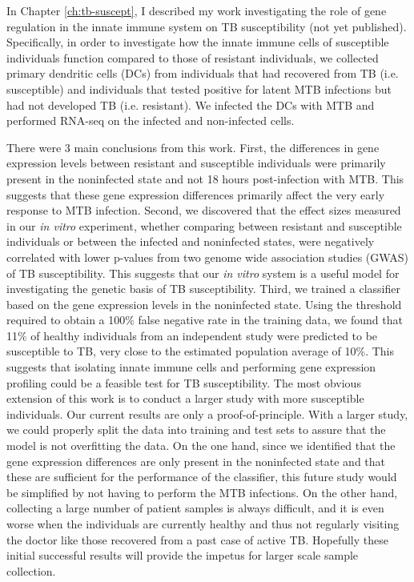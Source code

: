 In Chapter \ref{ch:tb-suscept}, I described my work investigating the
role of gene regulation in the innate immune system on TB
susceptibility (not yet published). Specifically, in order to
investigate how the innate immune cells of susceptible individuals
function compared to those of resistant individuals, we collected
primary dendritic cells (DCs) from individuals that had recovered from
TB (i.e. susceptible) and individuals that tested positive for latent
MTB infections but had not developed TB (i.e. resistant). We infected
the DCs with MTB and performed RNA-seq on the infected and
non-infected cells.

There were 3 main conclusions from this work. First, the differences
in gene expression levels between resistant and susceptible
individuals were primarily present in the noninfected state and not 18
hours post-infection with MTB. This suggests that these gene
expression differences primarily affect the very early response to MTB
infection. Second, we discovered that the effect sizes measured in our
\emph{in vitro} experiment, whether comparing between resistant and
susceptible individuals or between the infected and noninfected
states, were negatively correlated with lower p-values from two genome
wide association studies (GWAS) of TB susceptibility. This suggests
that our \emph{in vitro} system is a useful model for investigating
the genetic basis of TB susceptibility. Third, we trained a classifier
based on the gene expression levels in the noninfected state. Using
the threshold required to obtain a 100\% false negative rate in the
training data, we found that 11\% of healthy individuals from an
independent study were predicted to be susceptible to TB, very close
to the estimated population average of 10\%. This suggests that
isolating innate immune cells and performing gene expression profiling
could be a feasible test for TB susceptibility.  The most obvious
extension of this work is to conduct a larger study with more
susceptible individuals. Our current results are only a
proof-of-principle. With a larger study, we could properly split the
data into training and test sets to assure that the model is not
overfitting the data. On the one hand, since we identified that the
gene expression differences are only present in the noninfected state
and that these are sufficient for the performance of the classifier,
this future study would be simplified by not having to perform the MTB
infections. On the other hand, collecting a large number of patient
samples is always difficult, and it is even worse when the individuals
are currently healthy and thus not regularly visiting the doctor like
those recovered from a past case of active TB. Hopefully these initial
successful results will provide the impetus for larger scale sample
collection.

